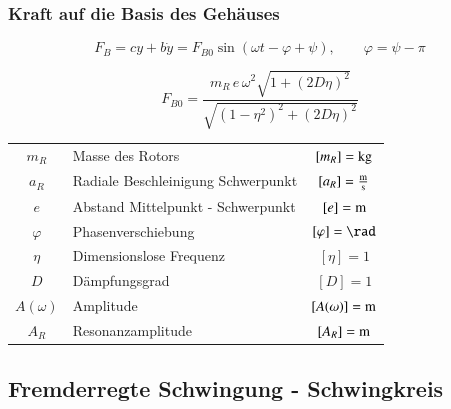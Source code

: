 

\subsubsection{Kraft auf die Basis des Gehäuses} 

\begin{minipage}{0.48\linewidth}
$$ F_B = c y + b \dot{y} = F_{B0} \sin(\omega t - \varphi + \psi) , \qquad \varphi = \psi - \pi $$ 
\end{minipage}
\hfill
\begin{minipage}{0.48\linewidth}
$$\boxed{ F_{B0} = \frac{m_R \, e \, \omega^2 \sqrt{1+ (2D \eta)^2}}{\sqrt{(1 - \eta^2)^2 + (2 D \eta)^2}} } $$ 
\end{minipage}
\vspace{0.2cm}


\begin{tabular}{c l c}
$m_R$ & Masse des Rotors & $[m_R] = \mathrm{kg}$ \\
$a_R$ & Radiale Beschleinigung Schwerpunkt & $[a_R] = \frac{\mathrm{m}}{\mathrm{s}}$ \\
$e$ & Abstand Mittelpunkt - Schwerpunkt & $[e] = \mathrm{m}$ \\
$\varphi$ & Phasenverschiebung & $[ \varphi] = \rad$ \\
$\eta$ & Dimensionslose Frequenz & $[\eta] = 1$  \\
$D$ & Dämpfungsgrad & $[D] = 1$  \\
$A(\omega)$ & Amplitude & $[A(\omega)] = \mathrm{m}$ \\
$A_R$ & Resonanzamplitude & $[A_R] = \mathrm{m}$
\end{tabular}




\subsection{Fremderregte Schwingung - Schwingkreis}

